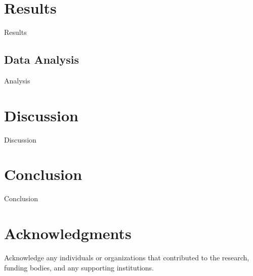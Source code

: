 \documentclass[final, 3p, 11pt]{elsarticle}
\begin{document}
\section{Results}
Results

\subsection{Data Analysis}
Analysis

\section{Discussion}
Discussion

\section{Conclusion}
Conclusion

\section*{Acknowledgments}
Acknowledge any individuals or organizations that contributed to the research, funding bodies, and any supporting institutions.


% 
% 


\end{document}
